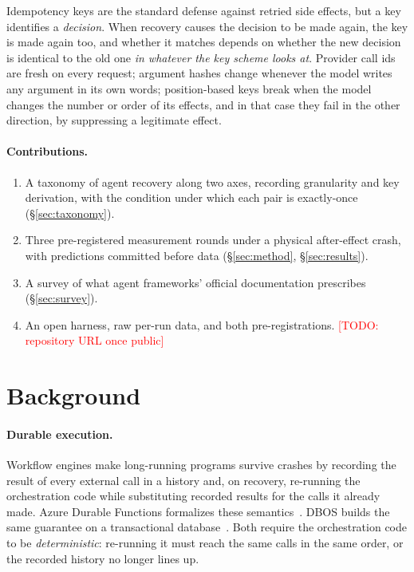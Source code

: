\documentclass[11pt]{article}
\newcommand{\todo}[1]{\textcolor{red}{[TODO: #1]}}
\begin{document}
Idempotency keys are the standard defense against retried side effects, but
a key identifies a \emph{decision}. When recovery causes the decision to be
made again, the key is made again too, and whether it matches depends on
whether the new decision is identical to the old one \emph{in whatever the key
scheme looks at}. Provider call ids are fresh on every request; argument
hashes change whenever the model writes any argument in its own words;
position-based keys break when the model changes the number or order of its
effects, and in that case they fail in the other direction, by suppressing a
legitimate effect.

\paragraph{Contributions.}
\begin{enumerate}
  \item A taxonomy of agent recovery along two axes, recording granularity and
        key derivation, with the condition under which each pair is
        exactly-once (\S\ref{sec:taxonomy}).
  \item Three pre-registered measurement rounds under a physical after-effect
        crash, with predictions committed before data (\S\ref{sec:method},
        \S\ref{sec:results}).
  \item A survey of what agent frameworks' official documentation prescribes
        (\S\ref{sec:survey}).
  \item An open harness, raw per-run data, and both pre-registrations.
        \todo{repository URL once public}
\end{enumerate}

\section{Background}
\paragraph{Durable execution.} Workflow engines make long-running programs
survive crashes by recording the result of every external call in a history
and, on recovery, re-running the orchestration code while substituting
recorded results for the calls it already made. Azure Durable Functions
formalizes these semantics~\cite{burckhardt2021durable}. DBOS builds the
same guarantee on a transactional database~\cite{skiadopoulos2021dbos}. Both
require the orchestration code to be \emph{deterministic}: re-running it must
reach the same calls in the same order, or the recorded history no longer
lines up.
\end{document}
